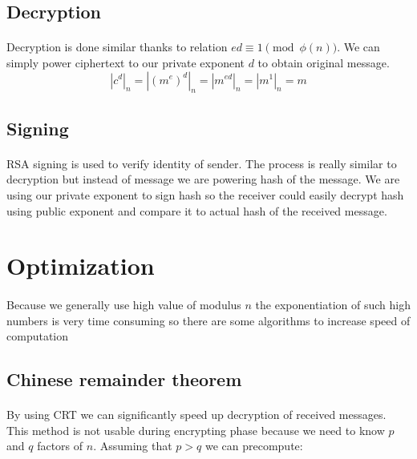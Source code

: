 \documentclass[thesis=B,english]{FITthesis}[2012/10/20]
\begin{document}
{\subsection{Decryption}
\paragraph*{}
{Decryption is done similar thanks to relation \(ed \equiv 1 \pmod{\phi(n)}\). We can simply power ciphertext to our private exponent \(d\) to obtain original message.  
\[ |c^d|_n = |(m^e)^d|_n = | m^{ed}|_n = |m^1|_n = m\]}

\subsection{Signing}
\paragraph*{}{
RSA signing is used to verify identity of sender. The process is really similar to decryption but instead of message we are powering hash of the message.
We are using our private exponent to sign hash so the receiver could easily decrypt hash using public exponent and compare it to actual hash of the received message.
}

\section{Optimization}
\paragraph*{}
{Because we generally use high value of modulus \(n\) the exponentiation of such high numbers is very time consuming so there are some algorithms to increase speed of computation }

\subsection{Chinese remainder theorem}

\paragraph*{}
{By using CRT we can significantly speed up decryption of received messages. This method is not usable during encrypting phase because we need to know \(p\) and \(q\) factors of \(n\).
Assuming that \(p>q\) we can precompute:}

}
\end{document}
